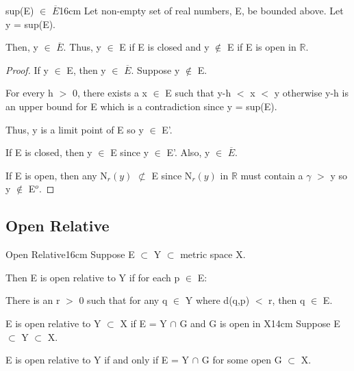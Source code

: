 	\vspace{0.5cm}



	\begin{wtheorem}{sup(E) $\in$ $\overline{E}$}{16cm}
		Let non-empty set of real numbers, E, be bounded above.
        Let y = sup(E).
		
		Then, y $\in$ $\overline{E}$.
        Thus, y $\in$ E if E is closed
		and y $\not \in$ E if E is open in $\mathbb{R}$.
	\end{wtheorem}
	
	\begin{proof}
		If y $\in$ E, then y $\in$ $\overline{E}$. Suppose y $\not \in$ E.

		For every h $>$ 0, there exists a x $\in$ E such that y-h $<$ x $<$ y
		otherwise y-h is an upper bound for E which is a contradiction
		since y = sup(E).

		Thus, y is a limit point of E so y $\in$ E'.

		If E is closed, then y $\in$ E since y $\in$ E'.	
		Also, y $\in$ $\overline{E}$.
		
		If E is open, then any N$_r(y)$ $\not \subset$ E since 
		N$_r(y)$ in $\mathbb{R}$ must contain a $\gamma$ $>$ y
		so y $\not \in$ E$^o$.
	\end{proof}

	\vspace{0.5cm}





\subsection{ Open Relative }

	\begin{definition}{Open Relative}{16cm}
		Suppose E $\subset$ Y $\subset$ metric space X.

		Then E is open relative to Y if for each p $\in$ E:
		
		\hspace{1cm}
		There is an r $>$ 0 such that for any q $\in$ Y where d(q,p) $<$ r,
		then q $\in$ E.
	\end{definition}
	
	\newpage



	\begin{wtheorem}{E is open relative to Y $\subset$ X
	if E = Y $\cap$ G and G is open in X}{14cm}
	Suppose E $\subset$ Y $\subset$ X.

	E is open relative to Y if and only if E = Y $\cap$ G
	for some open G $\subset$ X.
	\end{wtheorem}
	
